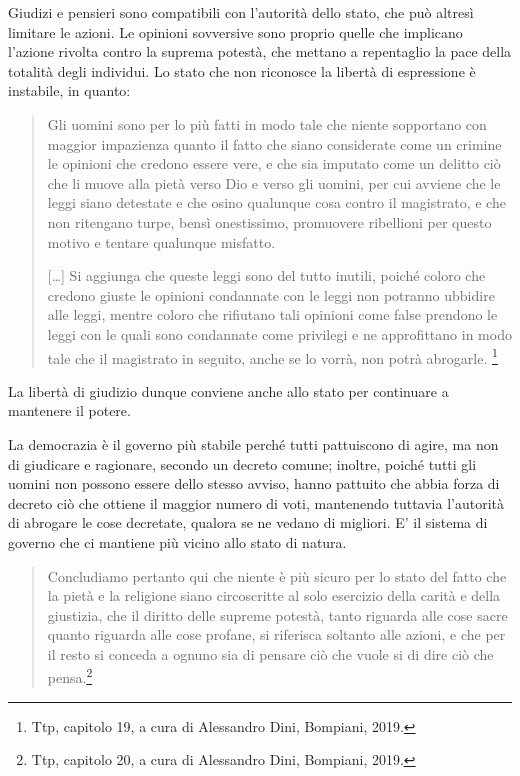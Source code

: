 Giudizi e pensieri sono compatibili con l'autorità dello stato, che può altresì limitare le azioni. Le opinioni sovversive sono proprio quelle che implicano l'azione rivolta contro la suprema potestà, che mettano a repentaglio la pace della totalità degli individui. Lo stato che non riconosce la libertà di espressione è instabile, in quanto:

\begin{quotation}
	\small Gli uomini sono per lo più fatti in modo tale che niente sopportano con maggior impazienza quanto il fatto che siano considerate come un crimine le opinioni che credono essere vere, e che sia imputato come un delitto ciò che li muove alla pietà verso Dio e verso gli uomini, per cui avviene che le leggi siano detestate e che osino qualunque cosa contro il magistrato, e che non ritengano turpe, bensì onestissimo, promuovere ribellioni per questo motivo e tentare qualunque misfatto.
	
	[\dots] Si aggiunga che queste leggi sono del tutto inutili, poiché coloro che credono giuste le opinioni condannate con le leggi non potranno ubbidire alle leggi, mentre coloro che rifiutano tali opinioni come false prendono le leggi con le quali sono condannate come privilegi e ne approfittano in modo tale che il magistrato in seguito, anche se lo vorrà, non potrà abrogarle.
	\footnote{Ttp, capitolo 19, a cura di Alessandro Dini, Bompiani, 2019.}
\end{quotation}

La libertà di giudizio dunque conviene anche allo stato per continuare a mantenere il potere.

La democrazia è il governo più stabile perché tutti pattuiscono di agire, ma non di giudicare e ragionare, secondo un decreto comune; inoltre,  poiché tutti gli uomini non possono essere dello stesso avviso, hanno pattuito che abbia forza di decreto ciò che  ottiene il maggior numero di voti, mantenendo tuttavia l'autorità di abrogare le cose decretate, qualora se ne vedano di migliori. E' il sistema di governo che ci mantiene più vicino allo stato di natura.

\begin{quotation}
	\small Concludiamo pertanto qui che niente è più sicuro per lo stato del fatto che la pietà e la religione siano circoscritte al solo esercizio della carità  e della giustizia, che il diritto delle supreme potestà, tanto riguarda alle cose sacre quanto riguarda alle cose profane, si riferisca soltanto alle azioni, e che per il resto si conceda a ognuno sia di pensare ciò che vuole si di dire ciò che pensa.\footnote{Ttp, capitolo 20, a cura di Alessandro Dini, Bompiani, 2019.}
\end{quotation}

\newpage